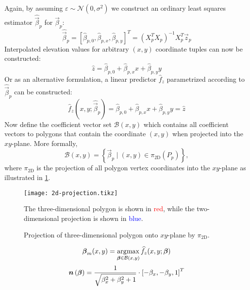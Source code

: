 %
Again, by assuming $\varepsilon \sim \mathcal{N}(0, \sigma^2)$ we construct an ordinary least squares estimator $\widehat{\vec{\beta}}_p $ for $\vec{\beta}_p$:
%
\begin{equation*}
  \widehat{\vec{\beta}}_p
  =
  {\left[
    \widehat{\beta}_{p,0},
    \widehat{\beta}_{p,x},
    \widehat{\beta}_{p,y}
  \right]}^T
  =
  \left( X_p^T X_p \right)^{-1} X_p^T \vec{z}_p
\end{equation*}
%
Interpolated elevation values for arbitrary $(x, y)$ coordinate tuples can now be constructed:
%
\begin{equation*}
  \widehat{z} = \widehat{\beta}_{p,0} + \widehat{\beta}_{p,x} x + \widehat{\beta}_{p,y} y
\end{equation*}
%
Or as an alternative formulation, a linear predictor $\widehat{f}_z$ parametrized according to $\widehat{\vec{\beta}}_p$ can be constructed:
%
\begin{equation*}
  \widehat{f}_z\left(x, y; \widehat{\vec{\beta}}_p\right)
  =
    \widehat{\beta}_{p,0}
    + \widehat{\beta}_{p,x} x
    + \widehat{\beta}_{p,y} y
  =
  \widehat{z}
\end{equation*}
%
Now define the coefficient vector set $\mathcal{B}(x, y)$ which contains all coefficient vectors to polygons that contain the coordinate $(x, y)$ when projected into the $xy$-plane.
More formally,
%
\begin{equation*}
  \mathcal{B}(x, y) = \left\{
    \vec{\beta}_p
    \mid
    (x, y) \in \pi_{\mathrm{2D}}(P_p)
  \right\},
\end{equation*}
%
where $\pi_{\mathrm{2D}}$ is the projection of all polygon vertex coordinates into the $xy$-plane as illustrated in \cref{fig:2d-polygon-projection}.
%
\begin{figure}
  \centering
  \texttt{[image: 2d-projection.tikz]}
  \caption{%
    Projection of three-dimensional polygon onto $xy$-plane by $\pi_{\mathrm{2D}}$.
  }{%
    The three-dimensional polygon is shown in \textcolor{red}{red}, while the two-dimensional projection is shown in \textcolor{blue}{blue}.
  }%
  \label{fig:2d-polygon-projection}
\end{figure}
%
\begin{equation*}
  \boldsymbol{\beta}_m(x, y)
  =
  \operatorname*{\arg\!\max}_{\boldsymbol{\beta} \in \mathcal{B}(x, y)}
    \widehat{f}_z(x, y; \boldsymbol{\beta})
\end{equation*}
%
\begin{equation*}
  \vec{n}\left(\vec{\beta}\right)
  =
  \frac{%
    1
  }{%
    \sqrt{\beta_x^2 + \beta_y^2 + 1}
  }
  \cdot
  {\left[
    -\beta_{x}, -\beta_{y}, 1
  \right]}^T
\end{equation*}



